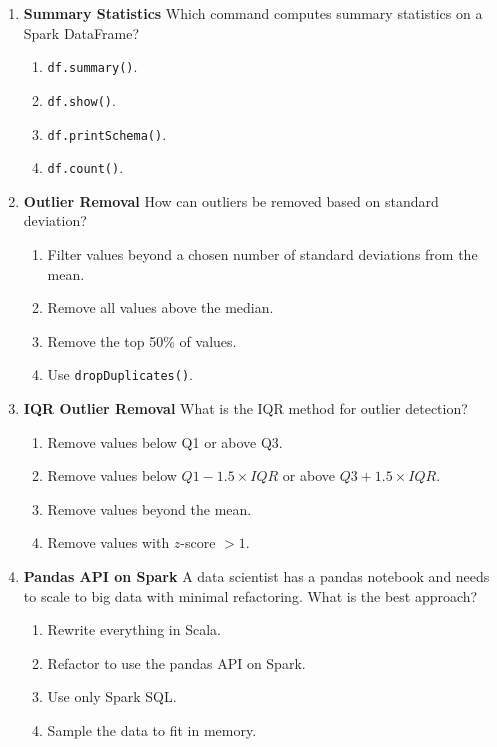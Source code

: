 \documentclass{article}
\begin{document}
\begin{enumerate}[label=\textbf{Q\arabic*.}]
		\item \textbf{Summary Statistics}
		Which command computes summary statistics on a Spark DataFrame?
		\begin{enumerate}[label=\Alph*.]
			\item \texttt{df.summary()}.
			\item \texttt{df.show()}.
			\item \texttt{df.printSchema()}.
			\item \texttt{df.count()}.
		\end{enumerate}
		
		\item \textbf{Outlier Removal}
		How can outliers be removed based on standard deviation?
		\begin{enumerate}[label=\Alph*.]
			\item Filter values beyond a chosen number of standard deviations from the mean.
			\item Remove all values above the median.
			\item Remove the top 50\% of values.
			\item Use \texttt{dropDuplicates()}.
		\end{enumerate}
		
		\item \textbf{IQR Outlier Removal}
		What is the IQR method for outlier detection?
		\begin{enumerate}[label=\Alph*.]
			\item Remove values below Q1 or above Q3.
			\item Remove values below $Q1 - 1.5 \times IQR$ or above $Q3 + 1.5 \times IQR$.
			\item Remove values beyond the mean.
			\item Remove values with $z$-score $> 1$.
		\end{enumerate}
		
		\item \textbf{Pandas API on Spark}
		A data scientist has a pandas notebook and needs to scale to big data with minimal refactoring. What is the best approach?
		\begin{enumerate}[label=\Alph*.]
			\item Rewrite everything in Scala.
			\item Refactor to use the pandas API on Spark.
			\item Use only Spark SQL.
			\item Sample the data to fit in memory.
		\end{enumerate}
		

\end{enumerate}
\end{document}
